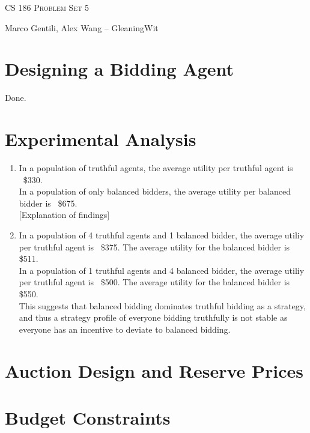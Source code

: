 \documentclass[12pt]{article}
\begin{document}
\thispagestyle{empty}

\begin{center}
{\Large \textsc{CS 186 Problem Set 5}}

\bigskip

Marco Gentili, Alex Wang -- GleaningWit
\end{center}

\section{Designing a Bidding Agent}
Done.

\section{Experimental Analysis}

\begin{enumerate}[label=(\alph*)]
\item In a population of truthful agents, the average utility per truthful agent is ~\$330. \\

In a population of only balanced bidders, the average utility per balanced bidder is ~\$675. \\

[Explanation of findings]

\item In a population of 4 truthful agents and 1 balanced bidder, the average utiliy per truthful agent is ~\$375. The average utility for the balanced bidder is \$511. \\

In a population of 1 truthful agents and 4 balanced bidder, the average utiliy per truthful agent is ~\$500. The average utility for the balanced bidder is \$550. \\

This suggests that balanced bidding dominates truthful bidding as a strategy, and thus a strategy profile of everyone bidding truthfully is not stable as everyone has an incentive to deviate to balanced bidding.

\end{enumerate}

\section{Auction Design and Reserve Prices}

\section{Budget Constraints}
\end{document}
